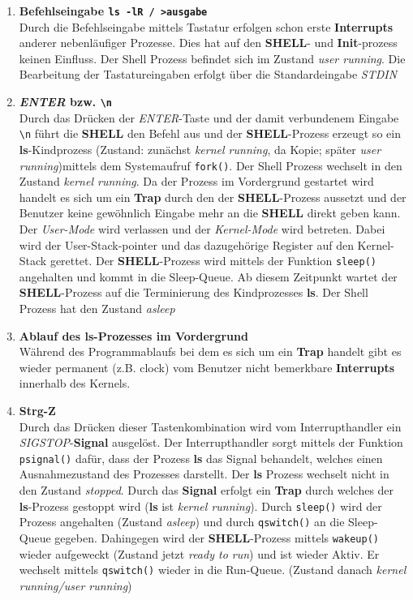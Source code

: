 \documentclass{ti2}
\begin{document}
\begin{enumerate}
	\item \textbf{Befehlseingabe \texttt{ls -lR / >ausgabe}}\\
		Durch die Befehlseingabe mittels Tastatur erfolgen schon erste \textbf{Interrupts} anderer nebenläufiger Prozesse. Dies hat auf den \textbf{SHELL}- und \textbf{Init}-prozess keinen Einfluss. Der Shell Prozess befindet sich im Zustand \textit{user running}. Die Bearbeitung der Tastatureingaben erfolgt über die Standardeingabe \textit{STDIN}
	\item \textbf{\textit{ENTER} bzw. \texttt{\textbackslash n}}\\
		Durch das Drücken der \textit{ENTER}-Taste und der damit verbundenem Eingabe \texttt{\textbackslash n} führt die \textbf{SHELL} den Befehl aus und der \textbf{SHELL}-Prozess erzeugt so ein \textbf{ls}-Kindprozess (Zustand: zunächst \textit{kernel running}, da Kopie; später \textit{user running})mittels dem Systemaufruf \texttt{fork()}. Der Shell Prozess wechselt in den Zustand \textit{kernel running}. Da der Prozess im Vordergrund gestartet wird handelt es sich um ein \textbf{Trap} durch den der \textbf{SHELL}-Prozess aussetzt und der Benutzer keine gewöhnlich Eingabe mehr an die \textbf{SHELL} direkt geben kann. Der \textit{User-Mode} wird verlassen und der \textit{Kernel-Mode} wird betreten. Dabei wird der User-Stack-pointer und das dazugehörige Register auf den Kernel-Stack gerettet. Der \textbf{SHELL}-Prozess wird mittels der Funktion \texttt{sleep()} angehalten und kommt in die Sleep-Queue. Ab diesem Zeitpunkt wartet der \textbf{SHELL}-Prozess auf die Terminierung des Kindprozesses \textbf{ls}. Der Shell Prozess hat den Zustand \textit{asleep}
	\item \textbf{Ablauf des \textbf{ls}-Prozesses im Vordergrund}\\
	Während des Programmablaufs bei dem es sich um ein \textbf{Trap} handelt gibt es wieder permanent (z.B. clock) vom Benutzer nicht bemerkbare \textbf{Interrupts} innerhalb des Kernels.
	\item \textbf{Strg-Z}\\
	Durch das Drücken dieser Tastenkombination wird vom Interrupthandler ein \textit{SIGSTOP}-\textbf{Signal} ausgelöst. Der Interrupthandler sorgt mittels der Funktion \texttt{psignal()} dafür, dass der Prozess \textbf{ls} das Signal behandelt, welches einen Ausnahmezustand des Prozesses darstellt. Der \textbf{ls} Prozess wechselt nicht in den Zustand \textit{stopped}. Durch das \textbf{Signal} erfolgt ein \textbf{Trap} durch welches der \textbf{ls}-Prozess gestoppt wird (\textbf{ls} ist \textit{kernel running}). Durch \texttt{sleep()} wird der Prozess angehalten (Zustand \textit{asleep}) und durch \texttt{qswitch()} an die Sleep-Queue gegeben. Dahingegen wird der \textbf{SHELL}-Prozess mittels \texttt{wakeup()} wieder aufgeweckt (Zustand jetzt \textit{ready to run}) und ist wieder Aktiv. Er wechselt mittels \texttt{qswitch()} wieder in die Run-Queue. (Zustand danach \textit{kernel running/user running})

\end{enumerate}
\end{document}
